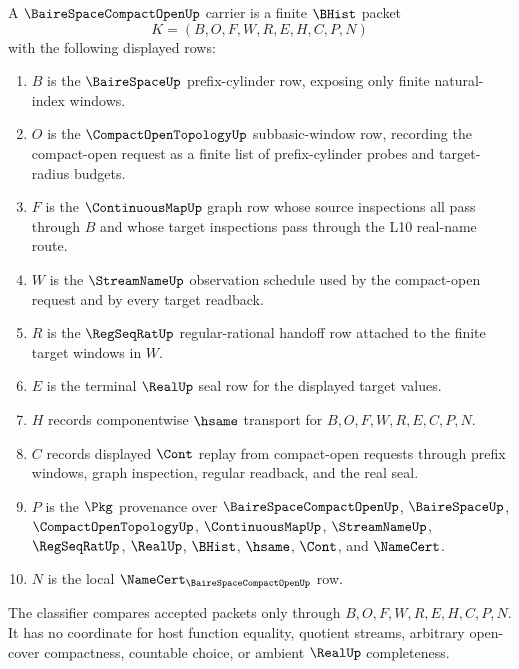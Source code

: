 \begin{definition}
\label{def:baire-space-compact-open-namecert-carrier}
A $\BaireSpaceCompactOpenUp$ carrier is a finite $\BHist$ packet
$$
K=(B,O,F,W,R,E,H,C,P,N)
$$
with the following displayed rows:
\begin{enumerate}
\item $B$ is the $\BaireSpaceUp$ prefix-cylinder row, exposing only finite natural-index windows.
\item $O$ is the $\CompactOpenTopologyUp$ subbasic-window row, recording the compact-open request as a finite list of prefix-cylinder probes and target-radius budgets.
\item $F$ is the $\ContinuousMapUp$ graph row whose source inspections all pass through $B$ and whose target inspections pass through the L10 real-name route.
\item $W$ is the $\StreamNameUp$ observation schedule used by the compact-open request and by every target readback.
\item $R$ is the $\RegSeqRatUp$ regular-rational handoff row attached to the finite target windows in $W$.
\item $E$ is the terminal $\RealUp$ seal row for the displayed target values.
\item $H$ records componentwise $\hsame$ transport for $B,O,F,W,R,E,C,P,N$.
\item $C$ records displayed $\Cont$ replay from compact-open requests through prefix windows, graph inspection, regular readback, and the real seal.
\item $P$ is the $\Pkg$ provenance over $\BaireSpaceCompactOpenUp$, $\BaireSpaceUp$, $\CompactOpenTopologyUp$, $\ContinuousMapUp$, $\StreamNameUp$, $\RegSeqRatUp$, $\RealUp$, $\BHist$, $\hsame$, $\Cont$, and $\NameCert$.
\item $N$ is the local $\NameCert_{\BaireSpaceCompactOpenUp}$ row.
\end{enumerate}
The classifier compares accepted packets only through $B,O,F,W,R,E,H,C,P,N$. It has no coordinate for host function equality, quotient streams, arbitrary open-cover compactness, countable choice, or ambient $\RealUp$ completeness.
\end{definition}

